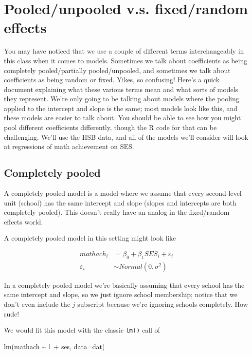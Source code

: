 \documentclass[
  letterpaper,
  DIV=11,
  numbers=noendperiod]{scrreprt}
\newenvironment{Shaded}{}{}
\newcommand{\AttributeTok}[1]{\textcolor[rgb]{0.49,0.56,0.16}{#1}}
\newcommand{\DecValTok}[1]{\textcolor[rgb]{0.25,0.63,0.44}{#1}}
\newcommand{\FunctionTok}[1]{\textcolor[rgb]{0.02,0.16,0.49}{#1}}
\newcommand{\NormalTok}[1]{#1}
\newcommand{\SpecialCharTok}[1]{\textcolor[rgb]{0.25,0.44,0.63}{#1}}
\begin{document}
\section{Pooled/unpooled v.s. fixed/random
effects}\label{pooledunpooled-v.s.-fixedrandom-effects}

You may have noticed that we use a couple of different terms
interchangeably in this class when it comes to models. Sometimes we talk
about coefficients as being completely pooled/partially pooled/unpooled,
and sometimes we talk about coefficients as being random or fixed.
Yikes, so confusing! Here's a quick document explaining what these
various terms mean and what sorts of models they represent. We're only
going to be talking about models where the pooling applied to the
intercept and slope is the same; most models look like this, and these
models are easier to talk about. You should be able to see how you might
pool different coefficients differently, though the R code for that can
be challenging. We'll use the HSB data, and all of the models we'll
consider will look at regressions of math achievement on SES.

\subsection{Completely pooled}\label{completely-pooled}

A completely pooled model is a model where we assume that every
second-level unit (school) has the same intercept and slope (slopes and
intercepts are both completely pooled). This doesn't really have an
analog in the fixed/random effects world.

A completely pooled model in this setting might look like

\[
\begin{aligned}
    mathach_i &= \beta_0 + \beta_1SES_i + \varepsilon_i \\
    \varepsilon_i &\sim Normal(0, \sigma^2)
\end{aligned}
\]

In a completely pooled model we're basically assuming that every school
has the same intercept and slope, so we just ignore school membership;
notice that we don't even include the \(j\) subscript because we're
ignoring schools completely. How rude!

We would fit this model with the classic \texttt{lm()} call of

\begin{Shaded}
\begin{Highlighting}[]
\FunctionTok{lm}\NormalTok{(mathach }\SpecialCharTok{\textasciitilde{}} \DecValTok{1} \SpecialCharTok{+}\NormalTok{ ses, }\AttributeTok{data=}\NormalTok{dat)}
\end{Highlighting}
\end{Shaded}
\end{document}
